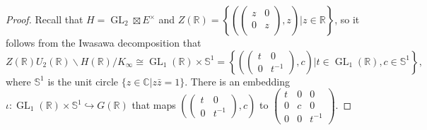 \documentclass[11pt, a4paper]{amsart}
\theoremstyle{plain}
\theoremstyle{definition}
\numberwithin{equation}{section}
\def\CC{\mathbb{C}}
\def\RR{\mathbb{R}}
\DeclareMathOperator{\GL}{\mathrm{GL}}
\begin{document}
\begin{proof}
   Recall that $H = \GL_2 \boxtimes E^{\times} $ and $Z(\RR) = \left \{(\begin{pmatrix}
                                                        z & 0 \\
                                                        0 & z \\ 
                                                    \end{pmatrix}, z) | z \in \RR \right \}$, so it follows from the Iwasawa decomposition that  
    \begin{equation*}
        Z(\RR) U_2(\RR) \backslash H(\RR) / K_{\infty} \cong \GL_1(\RR) \times \mathbb{S}^{1} = \left \{ (\begin{pmatrix}
                                                                                                    t & 0 \\
                                                                                                    0 & t^{-1} 
                                                                                                \end{pmatrix}, c) | t \in \GL_1(\RR), c \in \mathbb{S}^{1} \right \}, 
    \end{equation*}
    where $\mathbb{S}^{1}$ is the unit circle $\{ z \in \CC | z\bar{z} = 1 \}$. There is an embedding 
   $\iota \colon \GL_1(\RR) \times \mathbb{S}^{1} \hookrightarrow G(\RR)$ that maps $(\begin{pmatrix}
                                                                                    t & 0 \\
                                                                                    0 & t^{-1} 
                                                                                 \end{pmatrix}, c) $ to $\left(\begin{matrix}
                                                                                                            t & 0 & 0 \\
                                                                                                            0 & c & 0 \\
                                                                                                            0 & 0 & t^{-1} 
                                                                                                            \end{matrix}   \right)$. 

\end{proof}
\end{document}
